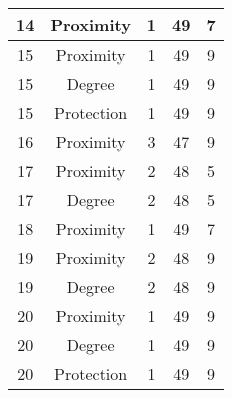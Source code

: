 \documentclass[results.tex]{subfiles}
\begin{document}
\begin{center}
\begin{tabular}{| c || c | c | c | c |}
            \hline
            14                      & Proximity                    & 1                      & 49                      & 7                    \\
            \hline
            15                      & Proximity                    & 1                      & 49                      & 9                    \\
            \hline
            15                      & Degree                       & 1                      & 49                      & 9                    \\
            \hline
            15                      & Protection                   & 1                      & 49                      & 9                    \\
            \hline
            16                      & Proximity                    & 3                      & 47                      & 9                    \\
            \hline
            17                      & Proximity                    & 2                      & 48                      & 5                    \\
            \hline
            17                      & Degree                       & 2                      & 48                      & 5                    \\
            \hline
            18                      & Proximity                    & 1                      & 49                      & 7                    \\
            \hline
            19                      & Proximity                    & 2                      & 48                      & 9                    \\
            \hline
            19                      & Degree                       & 2                      & 48                      & 9                    \\
            \hline
            20                      & Proximity                    & 1                      & 49                      & 9                    \\
            \hline
            20                      & Degree                       & 1                      & 49                      & 9                    \\
            \hline
            20                      & Protection                   & 1                      & 49                      & 9                    \\

\end{tabular}
\end{center}
\end{document}
